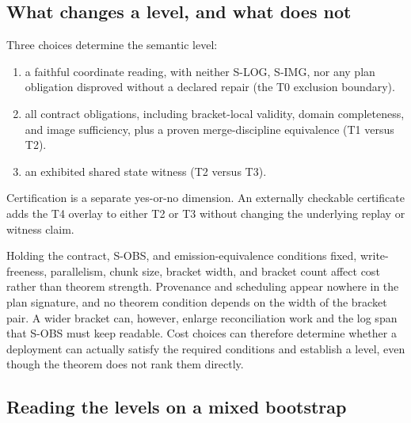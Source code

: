 \documentclass[sigconf,nonacm,10pt]{acmart}
\theoremstyle{plain}
\theoremstyle{definition}
\begin{document}
\subsection{What changes a level, and what does
not}\label{sec:tiers-choices}

Three choices determine the semantic level:

\begin{enumerate}
\item a faithful coordinate reading, with neither S-LOG, S-IMG,
nor any plan obligation disproved without a declared repair (the
T0 exclusion boundary).
\item all contract obligations, including bracket-local validity,
domain completeness, and image sufficiency, plus a proven
merge-discipline equivalence (T1 versus T2).
\item an exhibited shared state witness (T2 versus T3).
\end{enumerate}

Certification is a separate yes-or-no dimension. An externally
checkable certificate adds the T4 overlay to either T2 or T3 without
changing the underlying replay or witness claim.

Holding the contract, S-OBS, and emission-equivalence conditions fixed,
write-freeness, parallelism, chunk size, bracket width, and bracket
count affect cost rather than theorem strength. Provenance and
scheduling appear nowhere in the plan signature, and no theorem 
condition depends on the width of the bracket pair. A wider 
bracket can, however, enlarge reconciliation work and the log span
that S-OBS must keep readable. Cost choices can therefore determine
whether a deployment can actually satisfy the required conditions 
and establish a level, even though the theorem does not rank them 
directly.

\subsection{Reading the levels on a mixed bootstrap}
\label{sec:tiers-example}
\end{document}
